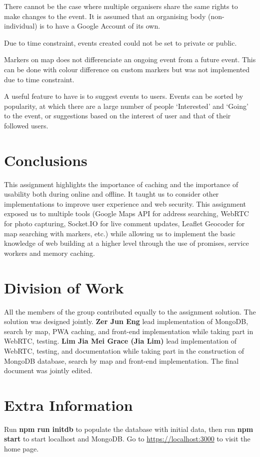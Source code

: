 \documentclass[11pt, a4paper]{article}
\begin{document}
\begin{enumerate*}[label=\textbf{\arabic*})]
\item There cannot be the case where multiple organisers share the same rights to make changes to
the event. It is assumed that an organising body (non-individual) is to have a Google Account of its
own.
\item Due to time constraint, events created could not be set to private or public.
\item Markers on map does not differenciate an ongoing event from a future event. This can be done
with colour difference on custom markers but was not implemented due to time constraint.
\item A useful feature to have is to suggest events to users. Events can be sorted by popularity,
at which there are a large number of people `Interested' and `Going' to the event, or suggestions
based on the interest of user and that of their followed users.
\end{enumerate*}

\section{Conclusions}
This assignment highlights the importance of caching and the importance of usability both during
online and offline. It taught us to consider other implementations to improve user experience and
web security. This assignment exposed us to multiple tools (Google Maps API for address searching,
WebRTC for photo capturing, Socket.IO for live comment updates, Leaflet Geocoder for map searching
with markers, etc.) while allowing us to implement the basic knowledge of web building at a higher
level through the use of promises, service workers and memory caching.

\section{Division of Work}
All the members of the group contributed equally to the assignment solution. The solution was
designed jointly. \textbf{Zer Jun Eng} lead implementation of MongoDB, search by map, PWA caching,
and front-end implementation while taking part in WebRTC, testing. \textbf{Lim Jia Mei Grace (Jia
Lim)} lead implementation of WebRTC, testing, and documentation while taking part in the
construction of MongoDB database, search by map and front-end implementation. The final document was
jointly edited.

\section{Extra Information}
Run \textbf{npm run initdb} to populate the database with initial data, then run \textbf{npm start}
to start localhost and MongoDB. Go to \url{https://localhost:3000} to visit the home page.
\end{document}
